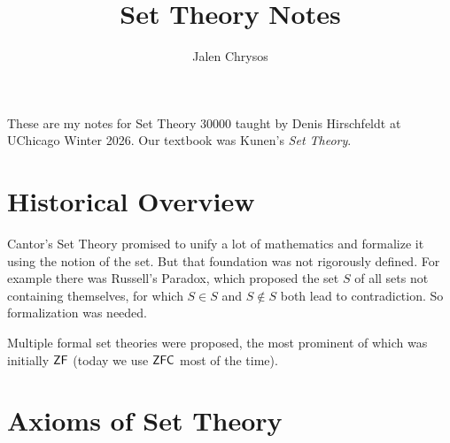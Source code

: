 \documentclass{amsart}
\title{Set Theory Notes}
\author{Jalen Chrysos}
\DeclareMathOperator{\ZFC}{\sf{ZFC}}
\DeclareMathOperator{\ZF}{\sf{ZF}}
\begin{document}
	
	\maketitle
	
	These are my notes for Set Theory 30000 taught by Denis Hirschfeldt at UChicago Winter 2026. Our textbook was Kunen's \textit{Set Theory}.
	
	\tableofcontents
	
	\newpage 
	
	
	\section{Historical Overview}
	
	Cantor's Set Theory promised to unify a lot of mathematics and formalize it using the notion of the set. But that foundation was not rigorously defined. For example there was Russell's Paradox, which proposed the set $S$ of all sets not containing themselves, for which $S\in S$ and $S\not\in S$ both lead to contradiction. So formalization was needed.
	
	Multiple formal set theories were proposed, the most prominent of which was initially $\ZF$ (today we use $\ZFC$ most of the time). 
	
	\newpage
	
	\section{Axioms of Set Theory} 
	
\end{document}
